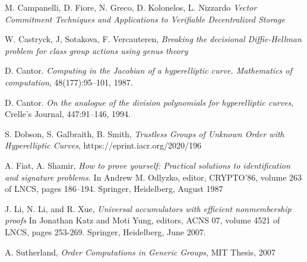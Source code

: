 \documentclass[11pt, lettersize, notitlepage, leqno, footskip=0.6cm]{article}
\newcommand{\noin}{\noindent}
\numberwithin{equation}{section}
\begin{document}
\noindent [CFGKN20] M. Campanelli, D. Fiore, N. Greco, D. Kolonelos, L. Nizzardo \textit{Vector Commitment Techniques and Applications to Verifiable Decentralized Storage} \vspace{0.1cm}

\noin [CSV20] W. Castryck, J, Sotakova, F. Vercauteren, \textit{Breaking the decisional Diffie-Hellman problem for class group actions using genus theory}\vspace{0.1cm}

\noindent [Can87] D. Cantor. \textit{Computing in the Jacobian of a hyperelliptic curve. Mathematics of computation}, 48(177):95–101, 1987.\vspace{0.1cm}

\noindent [Can94] D. Cantor. \textit{On the analogue of the division polynomials for hyperelliptic curves}, Crelle's Journal, 447:91–146, 1994.\vspace{0.1cm}


\noindent [DGS20] S. Dobson, S. Galbraith, B. Smith, \textit{Trustless Groups of Unknown Order with Hyperelliptic Curves}, https://eprint.iacr.org/2020/196\vspace{0.1cm}

\noindent [FS87] A. Fiat, A. Shamir, \textit{How to prove yourself: Practical solutions to identification and signature problems.} In Andrew M. Odlyzko, editor, CRYPTO’86, volume 263 of LNCS, pages 186–194. Springer, Heidelberg, August 1987\vspace{0.1cm}

\noin [LLX07] J. Li, N. Li, and R. Xue,  \textit{Universal accumulators with efficient nonmembership proofs} In Jonathan Katz and Moti Yung, editors, ACNS 07, volume 4521 of LNCS, pages 253-269. Springer, Heidelberg, June 2007.

\noindent [Sut07] A. Sutherland, \textit{Order Computations in Generic Groups}, MIT Thesis, 2007 \vspace{0.1cm}
\end{document}

